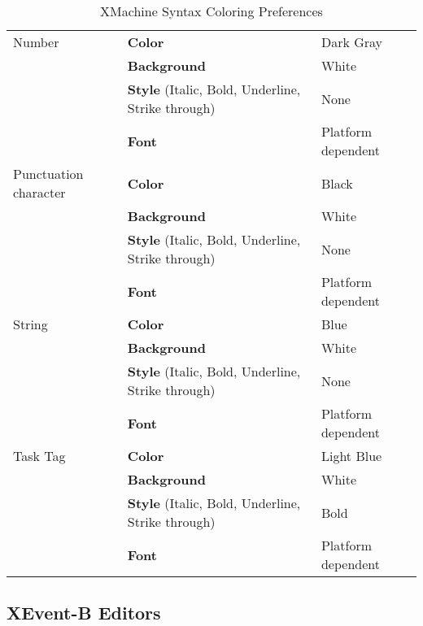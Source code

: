 \begin{EventBNoShortInline}
\begin{table}[!htbp]
\begin{tabular}{|p{}|p{}|p{}|}
      \hline
      Number & \textbf{Color} & Dark Gray \\
                                           & \textbf{Background} & White \\
                                           & \textbf{Style} (Italic, Bold, Underline, Strike through) & None \\
                                           & \textbf{Font} & Platform dependent \\
      \hline
      Punctuation character & \textbf{Color} & Black \\
                                           & \textbf{Background} & White \\
                                           & \textbf{Style} (Italic, Bold, Underline, Strike through) & None \\
                                           & \textbf{Font} & Platform dependent \\
      \hline
      String & \textbf{Color} & Blue \\
                                           & \textbf{Background} & White \\
                                           & \textbf{Style} (Italic, Bold, Underline, Strike through) & None \\
                                           & \textbf{Font} & Platform dependent \\
      \hline
      Task Tag & \textbf{Color} & Light Blue \\
                                           & \textbf{Background} & White \\
                                           & \textbf{Style} (Italic, Bold, Underline, Strike through) & Bold \\
                                           & \textbf{Font} & Platform dependent \\
      \hline
    \end{tabular}
    \caption{XMachine Syntax Coloring Preferences}
    \label{tab:xmachine-syntax-coloring-preference}
  \end{table}
\end{EventBNoShortInline}

\subsection{XEvent-B Editors}
\label{sec:xevent-b-editors}


